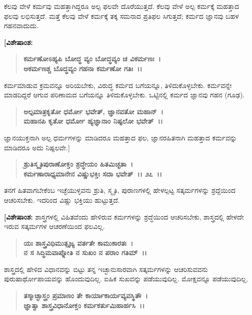 ಕೆಲವು ವೇಳೆ ಕರ್ಮವು ಮಹತ್ತಾಗಿದ್ದರೂ ಅಲ್ಪ ಫಲವೇ ದೊರೆಯುತ್ತದೆ. ಕೆಲವು ವೇಳೆ ಅಲ್ಪ ಕರ್ಮಕ್ಕೆ ಮಹತ್ತಾದ ಫಲವು ಲಭಿಸುತ್ತದೆ. ಮತ್ತೆ ಕೆಲವು ವೇಳೆ ಕರ್ಮಕ್ಕೆ ತಕ್ಕ ಸಮನಾದ ಪ್ರತಿಫಲ ಸಿಗುತ್ತದೆ; ಕರ್ಮದ ಜ್ಞಾನವು ಬಹಳ ಗಹನವಾದುದು.

\textbf{[ವಿಶೇಷಾಂಶ:}

\begin{verse}
\textbf{ಕರ್ಮಣೋಽಹ್ಯಪಿ ಬೋದ್ಧ ವ್ಯಂ ಬೋದ್ಧವ್ಯಂ ಚ ವಿಕರ್ಮಣಃ~।}\\\textbf{ಅಕರ್ಮಣಶ್ಚ ಬೊದ್ಧವ್ಯಂ ಗಹನಾ ಕರ್ಮಣೋ ಗತಿಃ~।।}
\end{verse}

ಕರ್ಮಮಾಡುವ ಕ್ರಮವನ್ನೂ ಅರಿಯಬೇಕು, ವಿರುದ್ಧ ಕರ್ಮದ ಬಗೆಯನ್ನೂ, ತಿಳಿದುಕೊಳ್ಳಬೇಕು. ಕರ್ಮವನ್ನೇ ಮಾಡದಿದ್ದರೆ ಆಗುವ ಪರಿಣಾಮದ ಬಗೆಯನ್ನೂ ತಿಳಿದುಕೊಳ್ಳಬೇಕು. ಒಟ್ಟಿನಲ್ಲಿ ಕರ್ಮದ ಜ್ಞಾನವು ಗಹನ (ಗೂಢ).

\begin{verse}
\textbf{ಅಲ್ಪಮಾತ್ರಕೃತೋ ಧರ್ಮೋ ಭವೇತ್, ಜ್ಞಾನವತೋ ಮಹಾನ್~।}\\\textbf{ಮಹಾನಪಿ ಕೃತೋ ಧರ್ಮೋ ಹ್ಯಜ್ಞಾನಾಂ ನಿಷ್ಫಲೋ ಭವೇತ್~।।}
\end{verse}

ಜ್ಞಾನಯುಕ್ತನಾಗಿ ಅಲ್ಪ ಧರ್ಮಗಳನ್ನು ಮಾಡಿದರೂ ಮಹತ್ತಾದ ಫಲ, ಜ್ಞಾನರಹಿತನಾಗಿ ಮಹತ್ತಾದ ಕರ್ಮವನ್ನು ಮಾಡಿದರೂ ಅದು ನಿಷ್ಫಲವೇ.]

\begin{verse}
\textbf{ಶ್ರುತಿಸ್ಮೃತಿಪುರಾಣೋಕ್ತಂ ಶ್ರದ್ಧೇಯಂ ಹಿತಮಿಚ್ಛತಾ~।}\\\textbf{ಕರ್ಮಣಾರಾಧ್ಯಮಾನೇನ ವಿಷ್ಣುಭಕ್ತಿಃ ಸದಾ ಭವೇತ್~।। ೨೭~।।}
\end{verse}

ತನಗೆ ಹಿತವಾಗಬೇಕೆಂಬ ಇಚ್ಛೆಯುಳ್ಳವನು ಶ್ರುತಿ, ಸ್ಮೃತಿ, ಪುರಾಣಗಳಲ್ಲಿ ಹೇಳಲ್ಪಟ್ಟ ಸತ್ಕರ್ಮಗಳನ್ನು ಶ್ರದ್ದೆಯಿಂದ ಆಚರಿಸಬೇಕು. ಇದರಿಂದ ವಿಷ್ಣು ಭಕ್ತಿಯು ಹುಟ್ಟುತ್ತದೆ.

\textbf{[ವಿಶೇಷಾಂಶ:} ಶಾಸ್ತ್ರಗಳಲ್ಲಿ ವಿಹಿತವೆಂದು ಹೇಳಿರುವ ಕರ್ಮಗಳನ್ನು ಶ್ರದ್ಧೆಯಿಂದ ಆಚರಿಸ\-ಬೇಕು, ಶಾಸ್ತ್ರದಲ್ಲಿ ಹೇಳದೇ ಇರುವ ಸತ್ಕರ್ಮಗಳ ಆಚರಣೆಯಿಂದ ಫಲವಿಲ್ಲ.

\begin{verse}
\textbf{ಯಃ ಶಾಸ್ತ್ರವಿಧಿಮುತ್ಸೃಜ್ಯ ವರ್ತತೇ ಕಾಮುಕಾರತಃ~।}\\\textbf{ನ ಸ ಸಿದ್ಧಿಮವಾಪ್ನೋತಿ ನ ಸುಖಂ ನ ಪರಾಂ ಗತಿಮ್~।।} 
\end{verse}

ಶಾಸ್ತ್ರದಲ್ಲಿ ಹೇಳಿದ ವಿಧಾನವನ್ನು ಬಿಟ್ಟು ತನ್ನ ಇಚ್ಛಾನುಸಾರವಾಗಿ ಸತ್ಕರ್ಮಗಳನ್ನು ಆಚರಿಸು\-ವವನು ಪುರುಷಾರ್ಥೋಪಾಯವನ್ನು ಹೊಂದುವುದಿಲ್ಲ. ಐಹಿಕ ಸುಖವನ್ನು ಪಡೆಯುವುದಿಲ್ಲ. ಮೋಕ್ಷವನ್ನೂ ಪಡೆಯುವುದಿಲ್ಲ.

\begin{verse}
\textbf{ತಸ್ಮಾಚ್ಛಾಸ್ತ್ರಂ ಪ್ರಮಾಣಂ ತೇ ಕಾರ್ಯಾಕಾರ್ಯವ್ಯವಸ್ಥಿತೌ~।}\\\textbf{ಜ್ಞಾತ್ವಾ ಶಾಸ್ತ್ರವಿಧಾನೋಕ್ತಂ ಕರ್ಮಕರ್ತುಮಿಹಾರ್ಹಸಿ~।।} 
\end{verse}


